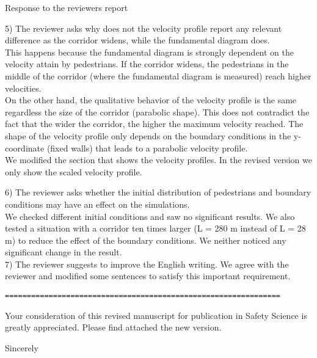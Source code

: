 \documentclass[a4paper,12pt]{letter}
\begin{document}
\begin{letter}{Response to the reviewers report}
{5) The reviewer asks why does not the velocity profile report any relevant difference as the corridor widens, while the fundamental diagram does.\\

This happens because the fundamental diagram is strongly dependent on the velocity attain by pedestrians. If the corridor widens, the pedestrians in the middle of the corridor (where the fundamental diagram is measured) reach higher velocities. \\

On the other hand, the qualitative behavior of the velocity profile is the same regardless the size of the corridor (parabolic shape). This does not contradict the fact that the wider the corridor, the higher the maximum velocity reached. The shape of the velocity profile only depends on the boundary conditions in the y-coordinate (fixed walls) that leads to a parabolic velocity profile. \\

We modified the section that shows the velocity profiles. In the revised version we only show the scaled velocity profile. 

6) The reviewer asks whether the initial distribution of pedestrians and boundary conditions may have an effect on the simulations.\\

We checked different initial conditions and saw no significant results. We also tested a situation with a corridor ten times larger (L = 280 m instead of L = 28 m) to reduce the effect of the boundary conditions. We neither noticed any significant change in the result. \\

7) The reviewer suggests to improve the English writing. We agree with the reviewer and modified some sentences to satisfy this important requirement.  \\

\begin{verbatim}
===============================================================
\end{verbatim}

}

Your consideration of this revised manuscript for publication in 
Safety Science is greatly appreciated. 
Please find attached the new version. \\

\closing{Sincerely}




\end{letter}
\end{document}
